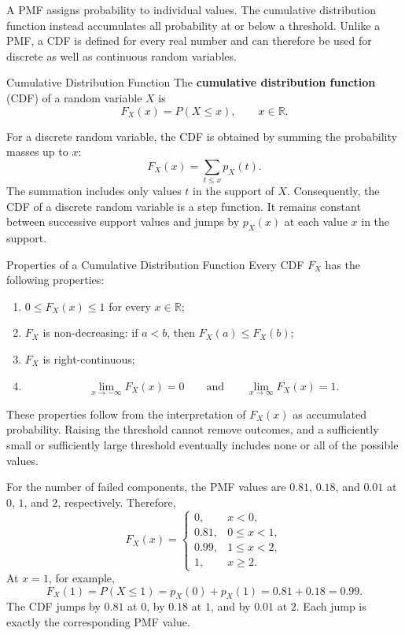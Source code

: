 A PMF assigns probability to individual values. The cumulative distribution function instead accumulates all probability at or below a threshold. Unlike a PMF, a CDF is defined for every real number and can therefore be used for discrete as well as continuous random variables.

\begin{definition}{Cumulative Distribution Function}
    The \textbf{cumulative distribution function} (CDF) of a random variable $X$ is
    \[
    F_X(x)=P(X\leq x),\qquad x\in\mathbb{R}.
    \]
\end{definition}

For a discrete random variable, the CDF is obtained by summing the probability masses up to $x$:
\[
F_X(x)=\sum_{t\leq x}p_X(t).
\]
The summation includes only values $t$ in the support of $X$. Consequently, the CDF of a discrete random variable is a step function. It remains constant between successive support values and jumps by $p_X(x)$ at each value $x$ in the support.

\begin{theorem}{Properties of a Cumulative Distribution Function}
    Every CDF $F_X$ has the following properties:
    \begin{enumerate}
        \item $0\leq F_X(x)\leq1$ for every $x\in\mathbb{R}$;
        \item $F_X$ is non-decreasing: if $a<b$, then $F_X(a)\leq F_X(b)$;
        \item $F_X$ is right-continuous;
        \item
        \[
        \lim_{x\to-\infty}F_X(x)=0
        \qquad\text{and}\qquad
        \lim_{x\to\infty}F_X(x)=1.
        \]
    \end{enumerate}
\end{theorem}

These properties follow from the interpretation of $F_X(x)$ as accumulated probability. Raising the threshold cannot remove outcomes, and a sufficiently small or sufficiently large threshold eventually includes none or all of the possible values.

\begin{example}\par
For the number of failed components, the PMF values are $0.81$, $0.18$, and $0.01$ at $0$, $1$, and $2$, respectively. Therefore,
\[
F_X(x)=
\begin{cases}
0, & x<0,\\
0.81, & 0\leq x<1,\\
0.99, & 1\leq x<2,\\
1, & x\geq2.
\end{cases}
\]
At $x=1$, for example,
\[
F_X(1)=P(X\leq1)=p_X(0)+p_X(1)=0.81+0.18=0.99.
\]
The CDF jumps by $0.81$ at $0$, by $0.18$ at $1$, and by $0.01$ at $2$. Each jump is exactly the corresponding PMF value.
\end{example}

